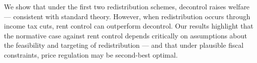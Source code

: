 \documentclass[parskip=full]{article}
\begin{document}
We show that under the first two redistribution schemes, decontrol raises welfare — consistent with standard theory. However, when redistribution occurs through income tax cuts, rent control can outperform decontrol. Our results highlight that the normative case against rent control depends critically on assumptions about the feasibility and targeting of redistribution — and that under plausible fiscal constraints, price regulation may be second-best optimal.

\end{document}
